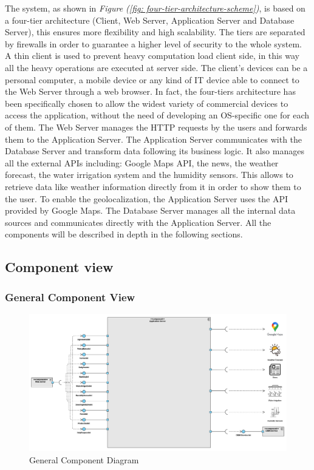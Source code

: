 \documentclass[table, 12pt]{article}
\begin{document}
The system, as shown in \textit{Figure (\ref{fig: four-tier-architecture-scheme})}, is based on a four-tier architecture (Client, Web Server, Application Server and Database Server), this ensures more flexibility and high scalability.
The tiers are separated by firewalls in order to guarantee a higher level of security to the whole system.
A thin client is used to prevent heavy computation load client side, in this way all the heavy operations are executed at server side.
The client's devices can be a personal computer, a mobile device or any kind of IT device able to connect to the Web Server through a web browser. In fact, the four-tiers architecture has been specifically chosen to allow the widest variety of commercial devices to access the application, without the need of developing an OS-specific one for each of them.
The Web Server manages the HTTP requests by the users and forwards them to the Application Server.
The Application Server communicates with the Database Server and transform data following its business logic.
It also manages all the external APIs including: Google Maps API, the news, the weather forecast, the water irrigation system and the humidity sensors.
This allows to retrieve data like weather information directly from it in order to show them to the user.
To enable the geolocalization, the Application Server uses the API provided by Google Maps.
The Database Server manages all the internal data sources and communicates directly with the Application Server.
All the components will be described in depth in the following sections.

\subsection{Component view}
\subsubsection*{General Component View}
\begin{center}
    \begin{figure}[H]
        \includegraphics[scale=0.45, center]{assets/general-component-view.png}
        \caption{General Component Diagram}
        \label{fig: general_component_view}
    \end{figure}
\end{center}
\end{document}
